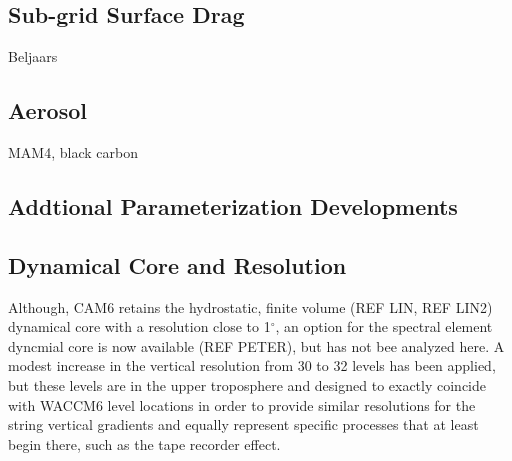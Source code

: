 \subsection{Sub-grid Surface Drag}
Beljaars
\subsection{Aerosol}
MAM4, black carbon
\subsection{Addtional Parameterization Developments}

\subsection{Dynamical Core and Resolution}
Although, CAM6 retains the hydrostatic, finite volume (REF LIN, REF LIN2) dynamical core with a resolution close to 1$^\circ$, an option for the spectral element dyncmial core is now available (REF PETER), but has not bee analyzed here. A modest increase in the vertical resolution from 30 to 32 levels has been applied, but these levels are in the upper troposphere and designed to exactly coincide with WACCM6 level locations in order to provide similar resolutions for the string vertical gradients and equally represent specific processes that at least begin there, such as the tape recorder effect. 